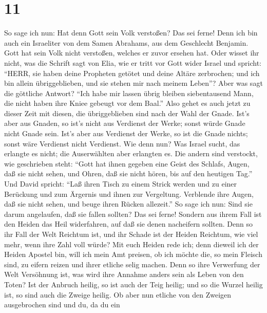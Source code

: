 \hypertarget{section-10}{%
\section{11}\label{section-10}}

 So sage ich nun: Hat denn Gott sein Volk verstoßen? Das sei
ferne! Denn ich bin auch ein Israeliter von dem Samen Abrahams, aus dem
Geschlecht Benjamin.  Gott hat sein Volk nicht verstoßen,
welches er zuvor ersehen hat. Oder wisset ihr nicht, was die Schrift
sagt von Elia, wie er tritt vor Gott wider Israel und spricht:
 ``HERR, sie haben deine Propheten getötet und deine Altäre
zerbrochen; und ich bin allein übriggeblieben, und sie stehen mir nach
meinem Leben''?  Aber was sagt die göttliche Antwort? ``Ich
habe mir lassen übrig bleiben siebentausend Mann, die nicht haben ihre
Kniee gebeugt vor dem Baal.''  Also gehet es auch jetzt zu
dieser Zeit mit diesen, die übriggeblieben sind nach der Wahl der Gnade.
 Ist's aber aus Gnaden, so ist's nicht aus Verdienst der
Werke; sonst würde Gnade nicht Gnade sein. Ist's aber aus Verdienst der
Werke, so ist die Gnade nichts; sonst wäre Verdienst nicht Verdienst.
 Wie denn nun? Was Israel sucht, das erlangte es nicht; die
Auserwählten aber erlangten es. Die andern sind verstockt, 
wie geschrieben steht: ``Gott hat ihnen gegeben eine Geist des Schlafs,
Augen, daß sie nicht sehen, und Ohren, daß sie nicht hören, bis auf den
heutigen Tag.''  Und David spricht: ``Laß ihren Tisch zu
einem Strick werden und zu einer Berückung und zum Ärgernis und ihnen
zur Vergeltung.  Verblende ihre Augen, daß sie nicht sehen,
und beuge ihren Rücken allezeit.''  So sage ich nun: Sind
sie darum angelaufen, daß sie fallen sollten? Das sei ferne! Sondern aus
ihrem Fall ist den Heiden das Heil widerfahren, auf daß sie denen
nacheifern sollten.  Denn so ihr Fall der Welt Reichtum
ist, und ihr Schade ist der Heiden Reichtum, wie viel mehr, wenn ihre
Zahl voll würde?  Mit euch Heiden rede ich; denn dieweil
ich der Heiden Apostel bin, will ich mein Amt preisen,  ob
ich möchte die, so mein Fleisch sind, zu eifern reizen und ihrer etliche
selig machen.  Denn so ihre Verwerfung der Welt Versöhnung
ist, was wird ihre Annahme anders sein als Leben von den Toten?
 Ist der Anbruch heilig, so ist auch der Teig heilig; und
so die Wurzel heilig ist, so sind auch die Zweige heilig. 
Ob aber nun etliche von den Zweigen ausgebrochen sind und du, da du ein
